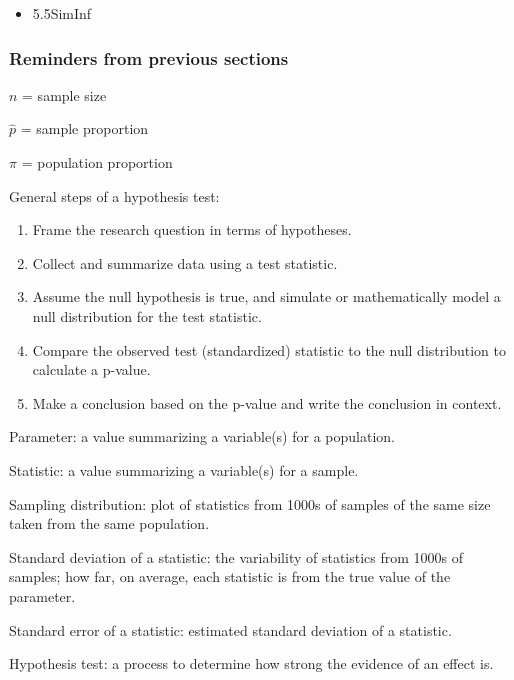 \documentclass[
]{report}
\providecommand{\tightlist}{%
  \setlength{\itemsep}{0pt}\setlength{\parskip}{0pt}}
\begin{document}
\begin{itemize}
\tightlist
\item
  5.5SimInf
\end{itemize}


\hypertarget{reminders-from-previous-sections-3}{%
\subsubsection*{Reminders from previous sections}\label{reminders-from-previous-sections-3}}

\(n\) = sample size

\(\hat{p}\) = sample proportion

\(\pi\) = population proportion

General steps of a hypothesis test:

\begin{enumerate}
\def\labelenumi{\arabic{enumi}.}
\item
  Frame the research question in terms of hypotheses.
\item
  Collect and summarize data using a test statistic.
\item
  Assume the null hypothesis is true, and simulate or mathematically model a null distribution for the test statistic.
\item
  Compare the observed test (standardized) statistic to the null distribution to calculate a p-value.
\item
  Make a conclusion based on the p-value and write the conclusion in context.
\end{enumerate}

Parameter: a value summarizing a variable(s) for a population.

Statistic: a value summarizing a variable(s) for a sample.

Sampling distribution: plot of statistics from 1000s of samples of the same size taken from the same population.

Standard deviation of a statistic: the variability of statistics from 1000s of samples; how far, on average, each statistic is from the true value of the parameter.

Standard error of a statistic: estimated standard deviation of a statistic.

Hypothesis test: a process to determine how strong the evidence of an effect is.
\end{document}
